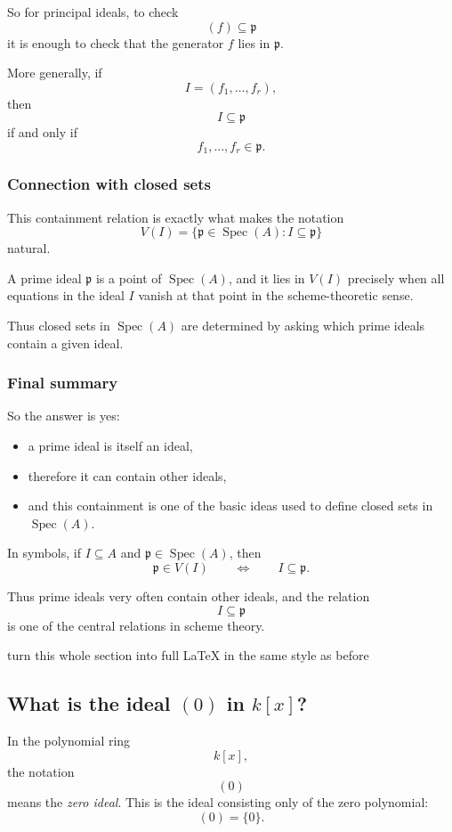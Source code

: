 \documentclass[12pt,a4paper]{article}
\theoremstyle{notespace}
\newcommand{\Spec}{\operatorname{Spec}}
\newcommand{\mf}{\mathfrak}
\theoremstyle{definition}
\begin{document}
So for principal ideals, to check
\[
(f)\subseteq \mf p
\]
it is enough to check that the generator \(f\) lies in \(\mf p\).

More generally, if
\[
I=(f_1,\dots,f_r),
\]
then
\[
I\subseteq \mf p
\]
if and only if
\[
f_1,\dots,f_r\in \mf p.
\]

\subsubsection{Connection with closed sets}

This containment relation is exactly what makes the notation
\[
V(I)=\{\mf p\in\Spec(A): I\subseteq \mf p\}
\]
natural.

A prime ideal \(\mf p\) is a point of \(\Spec(A)\), and it lies in \(V(I)\) precisely when all equations in the ideal \(I\) vanish at that point in the scheme-theoretic sense.

Thus closed sets in \(\Spec(A)\) are determined by asking which prime ideals contain a given ideal.

\subsubsection{Final summary}

So the answer is yes:

\begin{itemize}
	\item a prime ideal is itself an ideal,
	\item therefore it can contain other ideals,
	\item and this containment is one of the basic ideas used to define closed sets in \(\Spec(A)\).
\end{itemize}

In symbols, if \(I\subseteq A\) and \(\mf p\in\Spec(A)\), then
\[
\mf p\in V(I)
\qquad\Longleftrightarrow\qquad
I\subseteq \mf p.
\]

Thus prime ideals very often contain other ideals, and the relation
\[
I\subseteq \mf p
\]
is one of the central relations in scheme theory.


turn this whole section into full LaTeX in the same style as before

\subsection{What is the ideal \((0)\) in \(k[x]\)?}

In the polynomial ring
\[
k[x],
\]
the notation
\[
(0)
\]
means the \emph{zero ideal}. This is the ideal consisting only of the zero polynomial:
\[
(0)=\{0\}.
\]
\end{document}
